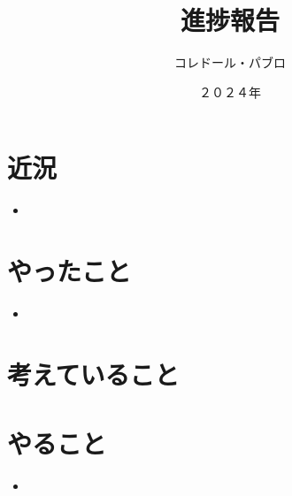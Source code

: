 \documentclass[a4paper, 12pt]{article}
\title{進捗報告}
\author{コレドール・パブロ}
\date{２０２４年}
\begin{document}
\maketitle

\section*{近況}
\begin{itemize}
    \item 
\end{itemize} 

\section*{やったこと}
\begin{itemize}
    \item 
\end{itemize}

\section*{考えていること}


\section*{やること}
\begin{itemize}
    \item 
\end{itemize}



\end{document}
